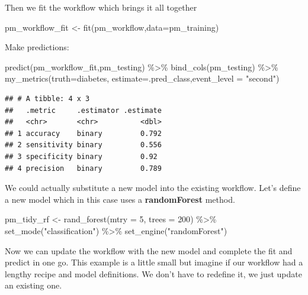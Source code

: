 \documentclass[
]{article}
\newenvironment{Shaded}{\begin{snugshade}}{\end{snugshade}}
\newcommand{\AttributeTok}[1]{\textcolor[rgb]{0.77,0.63,0.00}{#1}}
\newcommand{\DecValTok}[1]{\textcolor[rgb]{0.00,0.00,0.81}{#1}}
\newcommand{\FunctionTok}[1]{\textcolor[rgb]{0.00,0.00,0.00}{#1}}
\newcommand{\NormalTok}[1]{#1}
\newcommand{\OtherTok}[1]{\textcolor[rgb]{0.56,0.35,0.01}{#1}}
\newcommand{\SpecialCharTok}[1]{\textcolor[rgb]{0.00,0.00,0.00}{#1}}
\newcommand{\StringTok}[1]{\textcolor[rgb]{0.31,0.60,0.02}{#1}}
\begin{document}
Then we fit the workflow which brings it all together

\begin{Shaded}
\begin{Highlighting}[]
\NormalTok{pm\_workflow\_fit }\OtherTok{\textless{}{-}} \FunctionTok{fit}\NormalTok{(pm\_workflow,}\AttributeTok{data=}\NormalTok{pm\_training)}
\end{Highlighting}
\end{Shaded}

Make predictions:

\begin{Shaded}
\begin{Highlighting}[]
\FunctionTok{predict}\NormalTok{(pm\_workflow\_fit,pm\_testing) }\SpecialCharTok{\%\textgreater{}\%}
  \FunctionTok{bind\_cols}\NormalTok{(pm\_testing) }\SpecialCharTok{\%\textgreater{}\%}
  \FunctionTok{my\_metrics}\NormalTok{(}\AttributeTok{truth=}\NormalTok{diabetes, }\AttributeTok{estimate=}\NormalTok{.pred\_class,}\AttributeTok{event\_level =} \StringTok{"second"}\NormalTok{)}
\end{Highlighting}
\end{Shaded}

\begin{verbatim}
## # A tibble: 4 x 3
##   .metric     .estimator .estimate
##   <chr>       <chr>          <dbl>
## 1 accuracy    binary         0.792
## 2 sensitivity binary         0.556
## 3 specificity binary         0.92 
## 4 precision   binary         0.789
\end{verbatim}

We could actually substitute a new model into the existing workflow.
Let's define a new model which in this case uses a \textbf{randomForest}
method.

\begin{Shaded}
\begin{Highlighting}[]
\NormalTok{pm\_tidy\_rf }\OtherTok{\textless{}{-}} \FunctionTok{rand\_forest}\NormalTok{(}\AttributeTok{mtry =} \DecValTok{5}\NormalTok{, }\AttributeTok{trees =} \DecValTok{200}\NormalTok{) }\SpecialCharTok{\%\textgreater{}\%} 
  \FunctionTok{set\_mode}\NormalTok{(}\StringTok{"classification"}\NormalTok{) }\SpecialCharTok{\%\textgreater{}\%} 
  \FunctionTok{set\_engine}\NormalTok{(}\StringTok{"randomForest"}\NormalTok{)}
\end{Highlighting}
\end{Shaded}

Now we can update the workflow with the new model and complete the fit
and predict in one go. This example is a little small but imagine if our
workflow had a lengthy recipe and model definitions. We don't have to
redefine it, we just update an existing one.
\end{document}
